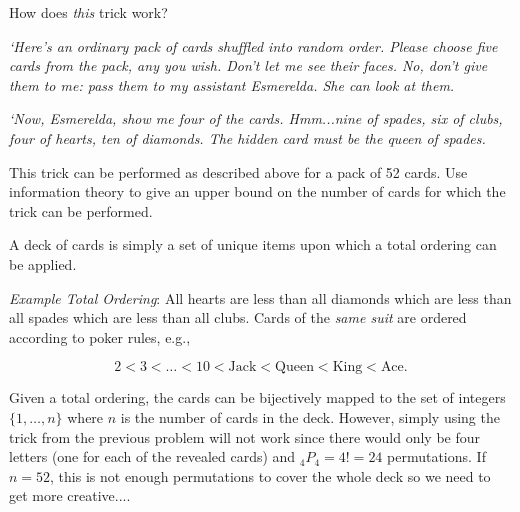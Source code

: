 \newpage
\begin{problem}{15}{6}
  How does \textit{this} trick work?
  
  \textnormal{\textit{`Here's an ordinary pack of cards shuffled into random order.  Please choose five cards from the pack, any you wish. Don't let me see their faces. No, don't give them to me: pass them to my assistant Esmerelda.  She can look at them.}}
  
  \textnormal{\textit{`Now, Esmerelda, show me four of the cards.  Hmm...nine of spades, six of clubs, four of hearts, ten of diamonds. The hidden card must be the queen of spades.}}
  
  This trick can be performed as described above for a pack of 52 cards.  Use information theory to give an upper bound on the number of cards for which the trick can be performed.
\end{problem}

A deck of cards is simply a set of unique items upon which a total ordering can be applied.  

\textit{Example Total Ordering}:
 All hearts are less than all diamonds which are less than all spades which are less than all clubs.  Cards of the \textit{same suit} are ordered according to poker rules, e.g.,

\[2 < 3 < \ldots < 10 < \text{Jack} < \text{Queen} < \text{King} < \text{Ace} \text{.} \]

Given a total ordering, the cards can be bijectively mapped to the set of integers $\{1,\ldots,n\}$ where $n$ is the number of cards in the deck. However, simply using the trick from the previous problem will not work since there would only be four letters (one for each of the revealed cards) and ${}_{4}P_{4} = 4! = 24$ permutations.  If $n=52$, this is not enough permutations to cover the whole deck so we need to get more creative....


